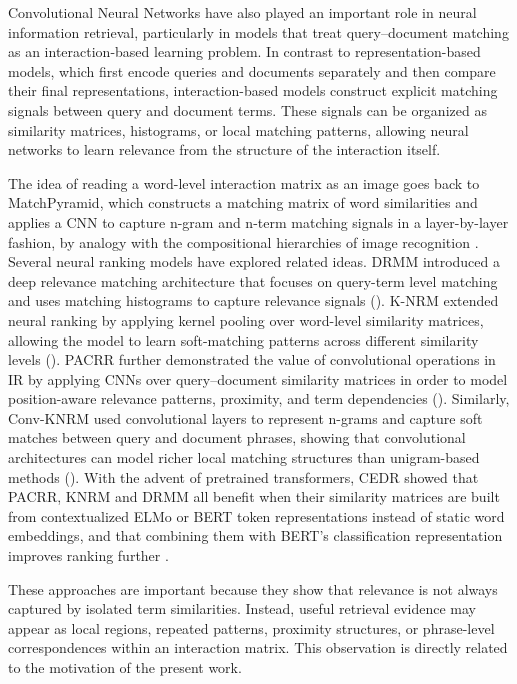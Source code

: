 \documentclass[preprint,5p,times,twocolumn,authoryear]{elsarticle}
\begin{document}
Convolutional Neural Networks have also played an important role in neural information retrieval, particularly in models that treat query--document matching as an interaction-based learning problem. In contrast to representation-based models, which first encode queries and documents separately and then compare their final representations, interaction-based models construct explicit matching signals between query and document terms. These signals can be organized as similarity matrices, histograms, or local matching patterns, allowing neural networks to learn relevance from the structure of the interaction itself.

The idea of reading a word-level interaction matrix as an image goes back to MatchPyramid, which constructs a matching matrix of word similarities and applies a CNN to capture n-gram and n-term matching signals in a layer-by-layer fashion, by analogy with the compositional hierarchies of image recognition \citep{pang2016matchpyramid}. Several neural ranking models have explored related ideas. DRMM introduced a deep relevance matching architecture that focuses on query-term level matching and uses matching histograms to capture relevance signals (\cite{guo2016deep}). K-NRM extended neural ranking by applying kernel pooling over word-level similarity matrices, allowing the model to learn soft-matching patterns across different similarity levels (\cite{Xiong_2017}). PACRR further demonstrated the value of convolutional operations in IR by applying CNNs over query--document similarity matrices in order to model position-aware relevance patterns, proximity, and term dependencies (\cite{pacrr}). Similarly, Conv-KNRM used convolutional layers to represent n-grams and capture soft matches between query and document phrases, showing that convolutional architectures can model richer local matching structures than unigram-based methods (\cite{convknrm}). With the advent of pretrained transformers, CEDR showed that PACRR, KNRM and DRMM all benefit when their similarity matrices are built from contextualized ELMo or BERT token representations instead of static word embeddings, and that combining them with BERT's classification representation improves ranking further \citep{macavaney2019cedr}.

These approaches are important because they show that relevance is not always captured by isolated term similarities. Instead, useful retrieval evidence may appear as local regions, repeated patterns, proximity structures, or phrase-level correspondences within an interaction matrix. This observation is directly related to the motivation of the present work.
\end{document}
